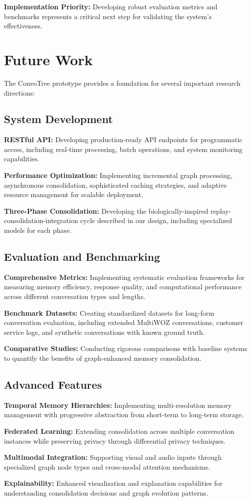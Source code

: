 \documentclass[11pt]{article}
\begin{document}
\textbf{Implementation Priority:} Developing robust evaluation metrics and benchmarks represents a critical next step for validating the system's effectiveness.

\section{Future Work}

The ConvoTree prototype provides a foundation for several important research directions:

\subsection{System Development}

\textbf{RESTful API:} Developing production-ready API endpoints for programmatic access, including real-time processing, batch operations, and system monitoring capabilities.

\textbf{Performance Optimization:} Implementing incremental graph processing, asynchronous consolidation, sophisticated caching strategies, and adaptive resource management for scalable deployment.

\textbf{Three-Phase Consolidation:} Developing the biologically-inspired replay-consolidation-integration cycle described in our design, including specialized models for each phase.

\subsection{Evaluation and Benchmarking}

\textbf{Comprehensive Metrics:} Implementing systematic evaluation frameworks for measuring memory efficiency, response quality, and computational performance across different conversation types and lengths.

\textbf{Benchmark Datasets:} Creating standardized datasets for long-form conversation evaluation, including extended MultiWOZ conversations, customer service logs, and synthetic conversations with known ground truth.

\textbf{Comparative Studies:} Conducting rigorous comparisons with baseline systems to quantify the benefits of graph-enhanced memory consolidation.

\subsection{Advanced Features}

\textbf{Temporal Memory Hierarchies:} Implementing multi-resolution memory management with progressive abstraction from short-term to long-term storage.

\textbf{Federated Learning:} Extending consolidation across multiple conversation instances while preserving privacy through differential privacy techniques.

\textbf{Multimodal Integration:} Supporting visual and audio inputs through specialized graph node types and cross-modal attention mechanisms.

\textbf{Explainability:} Enhanced visualization and explanation capabilities for understanding consolidation decisions and graph evolution patterns.
\end{document}
